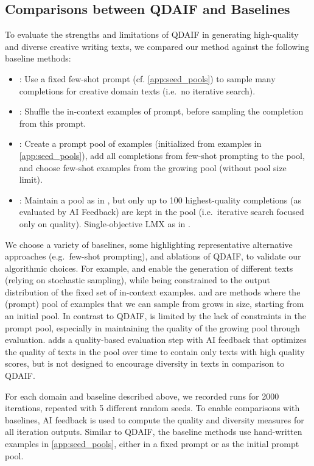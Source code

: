 \subsection{Comparisons between QDAIF and Baselines}\label{main:non_qd_baselines}

To evaluate the strengths and limitations of QDAIF in generating high-quality and diverse creative writing texts, we compared our method against the following baseline methods:
\begin{itemize}
    \item \baseone: Use a fixed few-shot prompt (cf. \cref{app:seed_pools}) to sample many completions for creative domain texts (i.e.\ no iterative search).
    \item \basetwo: Shuffle the in-context examples of \baseone{} prompt, before sampling the completion from this prompt.
    \item \basethree: Create a prompt pool of examples (initialized from examples in \cref{app:seed_pools}), add all completions from few-shot prompting to the pool, and choose few-shot examples from the growing pool (without pool size limit).
    \item \basefour: Maintain a pool as in \basethree, but only up to 100 highest-quality completions (as evaluated by AI Feedback) are kept in the pool (i.e.\ iterative search focused only on quality). Single-objective LMX as in \citet{meyerson2023language}.
\end{itemize}

We choose a variety of baselines, some highlighting representative alternative approaches (e.g.\ few-shot prompting), and ablations of QDAIF, to validate our algorithmic choices.  For example, \baseone{} and \basetwo{} enable the generation of different texts (relying on stochastic sampling), while being constrained to the output distribution of the fixed set of in-context examples. \basethree{} and \basefour{} are methods where the (prompt) pool of examples that we can sample from grows in size, starting from an initial pool. In contrast to QDAIF, \basethree{} is limited by the lack of constraints in the prompt pool, especially in maintaining the quality of the growing pool through evaluation. \basefour{} adds a quality-based evaluation step with AI feedback that optimizes the quality of texts in the pool over time to contain only texts with high quality scores, but is not designed to encourage diversity in texts in comparison to QDAIF.

For each domain and baseline described above, we recorded runs for 2000 iterations, repeated with 5 different random seeds. To enable comparisons with baselines, AI feedback is used to compute the quality and diversity measures for all iteration outputs. Similar to QDAIF, the baseline methods use hand-written examples in \cref{app:seed_pools}, either in a fixed prompt or as the initial prompt pool.

